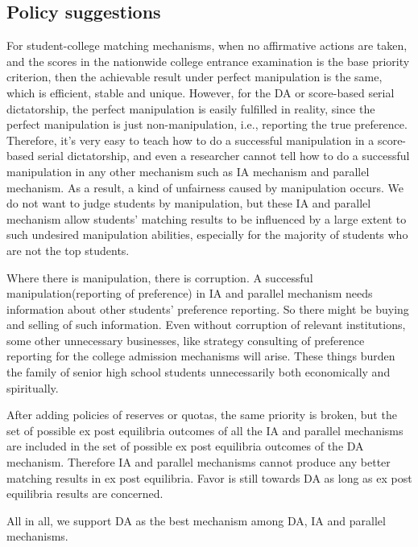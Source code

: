  






\subsection{Policy suggestions}

For student-college matching mechanisms, when no affirmative actions are taken, and the scores in the nationwide college entrance examination is the base priority criterion, then the achievable result under perfect
manipulation is the same, which is efficient, stable and
unique. However, for the DA or score-based serial dictatorship,
the perfect manipulation is easily fulfilled in reality, since the
perfect manipulation is just non-manipulation, i.e., reporting the
true preference. Therefore, it's very easy to teach how to do a
successful manipulation in a score-based serial dictatorship, and even
a researcher cannot tell how to do a successful manipulation in
any other mechanism such as IA mechanism and parallel mechanism. As a
result, a kind of unfairness caused by manipulation occurs. We do not
want to judge students by manipulation, but these IA and parallel
mechanism allow students' matching results to be influenced by a large
extent to such undesired manipulation abilities, especially for the
majority of students
who are not the top students. 

Where there is manipulation, there is
corruption. A successful manipulation(reporting of preference) in IA
and parallel mechanism needs information about other students'
preference reporting. So there might be buying and selling of such
information. Even without corruption of relevant institutions, some
other unnecessary  businesses, like strategy
consulting of preference  reporting  for  the college admission
mechanisms will arise.  These things  burden the family
of senior high school students unnecessarily both economically and
spiritually.

After adding policies of reserves or quotas, the same priority is broken, but the set of possible ex post equilibria outcomes of all the IA and parallel mechanisms are included in the set of  possible ex post equilibria outcomes of the DA mechanism. Therefore IA and parallel mechanisms cannot produce any better matching results in ex post equilibria. Favor is still towards DA as long as ex post equilibria results are concerned.

All in all, we support DA as the best mechanism among DA, IA and parallel mechanisms.




 
